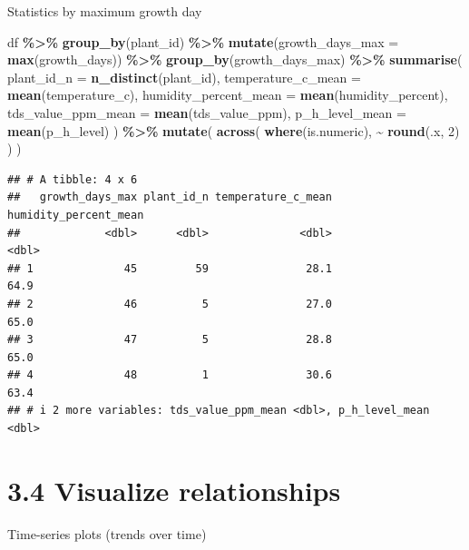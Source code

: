 \documentclass[
]{article}
\newenvironment{Shaded}{\begin{snugshade}}{\end{snugshade}}
\newcommand{\AttributeTok}[1]{\textcolor[rgb]{0.13,0.29,0.53}{#1}}
\newcommand{\DecValTok}[1]{\textcolor[rgb]{0.00,0.00,0.81}{#1}}
\newcommand{\FunctionTok}[1]{\textcolor[rgb]{0.13,0.29,0.53}{\textbf{#1}}}
\newcommand{\NormalTok}[1]{#1}
\newcommand{\SpecialCharTok}[1]{\textcolor[rgb]{0.81,0.36,0.00}{\textbf{#1}}}
\begin{document}
Statistics by maximum growth day

\begin{Shaded}
\begin{Highlighting}[]
\NormalTok{df }\SpecialCharTok{\%\textgreater{}\%} \FunctionTok{group\_by}\NormalTok{(plant\_id) }\SpecialCharTok{\%\textgreater{}\%} 
  \FunctionTok{mutate}\NormalTok{(}\AttributeTok{growth\_days\_max =} \FunctionTok{max}\NormalTok{(growth\_days)) }\SpecialCharTok{\%\textgreater{}\%} 
  \FunctionTok{group\_by}\NormalTok{(growth\_days\_max) }\SpecialCharTok{\%\textgreater{}\%} 
  \FunctionTok{summarise}\NormalTok{(}
    \AttributeTok{plant\_id\_n =} \FunctionTok{n\_distinct}\NormalTok{(plant\_id),}
            \AttributeTok{temperature\_c\_mean =} \FunctionTok{mean}\NormalTok{(temperature\_c),}
            \AttributeTok{humidity\_percent\_mean =} \FunctionTok{mean}\NormalTok{(humidity\_percent),}
            \AttributeTok{tds\_value\_ppm\_mean =} \FunctionTok{mean}\NormalTok{(tds\_value\_ppm),}
            \AttributeTok{p\_h\_level\_mean =} \FunctionTok{mean}\NormalTok{(p\_h\_level)}
\NormalTok{  ) }\SpecialCharTok{\%\textgreater{}\%} 
  \FunctionTok{mutate}\NormalTok{(}
    \FunctionTok{across}\NormalTok{(}
      \FunctionTok{where}\NormalTok{(is.numeric), }\SpecialCharTok{\textasciitilde{}} \FunctionTok{round}\NormalTok{(.x, }\DecValTok{2}\NormalTok{)}
\NormalTok{      )}
\NormalTok{  )}
\end{Highlighting}
\end{Shaded}

\begin{verbatim}
## # A tibble: 4 x 6
##   growth_days_max plant_id_n temperature_c_mean humidity_percent_mean
##             <dbl>      <dbl>              <dbl>                 <dbl>
## 1              45         59               28.1                  64.9
## 2              46          5               27.0                  65.0
## 3              47          5               28.8                  65.0
## 4              48          1               30.6                  63.4
## # i 2 more variables: tds_value_ppm_mean <dbl>, p_h_level_mean <dbl>
\end{verbatim}

\section{3.4 Visualize relationships}\label{visualize-relationships}

Time-series plots (trends over time)
\end{document}
